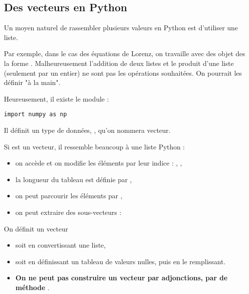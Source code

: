 \subsection{Des vecteurs en Python}
Un moyen naturel de rassembler plusieurs valeurs en Python est d'utiliser une liste.

Par exemple, dans le cas des équations de Lorenz, on travaille avec des objet des la forme \type{[x, y, z]}. Malheureusement l'addition de deux listes et le produit d'une liste (seulement par un entier) ne sont pas les opérations souhaitées.
On pourrait les définir "à la main".

Heureusement, il existe le module  :
\begin{lstlisting}
import numpy as np
\end{lstlisting} 

Il définit un type de données, , qu'on nommera vecteur.

Si  est un vecteur, il ressemble beaucoup à une liste Python :
\begin{itemize}
\item on accède et on modifie les éléments par leur indice : , ,
\item la longueur du tableau est définie par ,
\item on peut parcourir les éléments par ,
\item on peut extraire des sous-vecteurs : 
\end{itemize}

On définit un vecteur
\begin{itemize}
\item soit en convertissant une liste, 
\item soit en définissant un tableau de valeurs nulles,  puis en le remplissant.
\item {\bf On ne peut pas construire un vecteur par adjonctions, par de méthode }.
\end{itemize}

